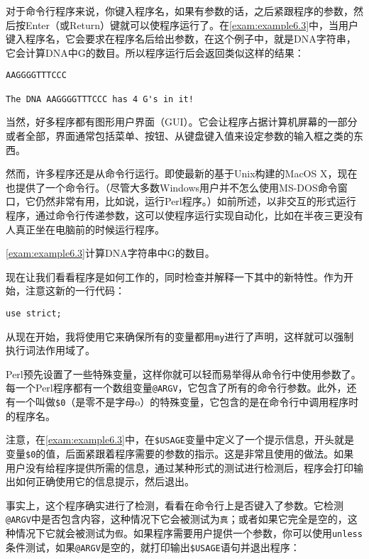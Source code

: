 对于命令行程序来说，你键入程序名，如果有参数的话，之后紧跟程序的参数，然后按Enter（或Return）键就可以使程序运行了。在\autoref{exam:example6.3}中，当用户键入程序名，它会要求在程序名后给出参数，在这个例子中，就是DNA字符串，它会计算DNA中G的数目。所以程序运行后会返回类似这样的结果：

\begin{lstlisting}
AAGGGGTTTCCC

The DNA AAGGGGTTTCCC has 4 G's in it!
\end{lstlisting}

当然，好多程序都有图形用户界面（GUI）。它会让程序占据计算机屏幕的一部分或者全部，界面通常包括菜单、按钮、从键盘键入值来设定参数的输入框之类的东西。

然而，许多程序还是从命令行运行。即使最新的基于Unix构建的MacOS
X，现在也提供了一个命令行。（尽管大多数Windows用户并不怎么使用MS-DOS命令窗口，它仍然非常有用，比如说，运行Perl程序。）如前所述，以非交互的形式运行程序，通过命令行传递参数，这可以使程序运行实现自动化，比如在半夜三更没有人真正坐在电脑前的时候运行程序。

\autoref{exam:example6.3}计算DNA字符串中G的数目。



现在让我们看看程序是如何工作的，同时检查并解释一下其中的新特性。作为开始，注意这新的一行代码：

\begin{lstlisting}
use strict;
\end{lstlisting}

从现在开始，我将使用它来确保所有的变量都用\verb|my|进行了声明，这样就可以强制执行词法作用域了。

Perl预先设置了一些特殊变量，这样你就可以轻而易举得从命令行中使用参数了。每一个Perl程序都有一个数组变量\verb|@ARGV|，它包含了所有的命令行参数。此外，还有一个叫做\verb|$0|（是零不是字母o）的特殊变量，它包含的是在命令行中调用程序时的程序名。

注意，在\autoref{exam:example6.3}中，在\verb|$USAGE|变量中定义了一个提示信息，开头就是变量\verb|$0|的值，后面紧跟着程序需要的参数的指示。这是非常且使用的做法。如果用户没有给程序提供所需的信息，通过某种形式的测试进行检测后，程序会打印输出如何正确使用它的信息提示，然后退出。

事实上，这个程序确实进行了检测，看看在命令行上是否键入了参数。它检测\verb|@ARGV|中是否包含内容，这种情况下它会被测试为\verb|真|；或者如果它完全是空的，这种情况下它就会被测试为\verb|假|。如果程序需要用户提供一个参数，你可以使用\verb|unless|条件测试，如果\verb|@ARGV|是空的，就打印输出\verb|$USAGE|语句并退出程序：

